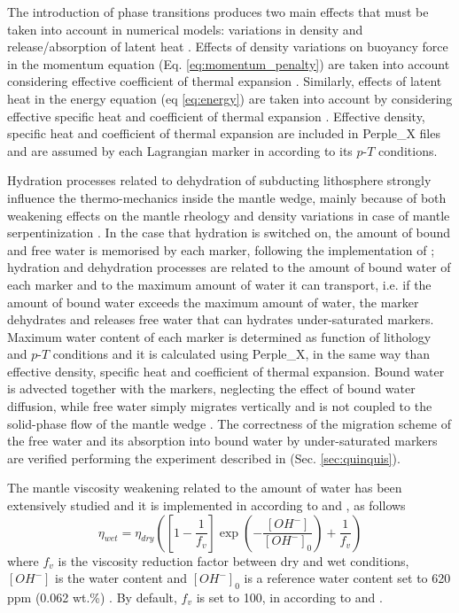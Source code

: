 \documentclass[hidelinks,10pt,a4paper]{article}
\begin{document}
The introduction of phase transitions produces two main effects that must be taken into account in numerical models: variations in density and release/absorption
of latent heat \citep{Tackley2010}. Effects of density variations on buoyancy force in the momentum equation (Eq. \ref{eq:momentum_penalty}) are taken into
account considering effective coefficient of thermal expansion \citep{Christensen1985,Zhong2015}. Similarly, effects of latent heat in the energy equation
(eq \ref{eq:energy}) are taken into account by considering effective specific heat and coefficient of thermal expansion
\citep{Christensen1985,Tackley2010,Zhong2015}. Effective density, specific heat and coefficient of thermal expansion are included in Perple\_X files and are
assumed by each Lagrangian marker in according to its $p$-$T$ conditions.

Hydration processes related to dehydration of subducting lithosphere \citep{Schmidt1998,Liu2007,Faccenda2009,Faccenda2010,Faccenda2014,Rosas2016} strongly
influence the thermo-mechanics inside the mantle wedge, mainly because of both weakening effects on the mantle rheology and density variations in case of
mantle serpentinization \citep{Gerya2002,Honda2003,Arcay2005,Roda2010,Regorda2017}. In the case that hydration is switched on, the amount of bound and free
water is memorised by each marker, following the implementation of \citet{Quinquis2014}; hydration and dehydration processes are related to the amount of bound
water of each marker and to the maximum amount of water it can transport, i.e. if the amount of bound water exceeds the maximum amount of water, the marker
dehydrates and releases free water that can hydrates under-saturated markers. Maximum water content of each marker is determined as function of lithology and
$p$-$T$ conditions and it is calculated using Perple\_X, in the same way than effective density, specific heat and coefficient of thermal expansion. Bound water
is advected together with the markers, neglecting the effect of bound water diffusion, while free water simply migrates vertically and is not coupled to the
solid-phase flow of the mantle wedge \citep{Arcay2005,Quinquis2014}. The correctness of the migration scheme of the free water and its absorption into bound
water by under-saturated markers are verified performing the experiment described in \citet{Quinquis2014} (Sec. \ref{sec:quinquis}).

The mantle viscosity weakening related to the amount of water has been extensively studied \citep{Chopra1981,Hirth2003} and it is implemented in according to
\citet{Arcay2005} and \citet{Horiuchi2016}, as follows
\begin{equation}\label{eq:wet_visc}
\eta_{wet}=\eta_{dry}\left(\left[1-\frac{1}{f_v}\right]\exp\left(-\frac{[OH^-]}{[OH^-]_0}\right)+\frac{1}{f_v}\right)
\end{equation}
where $f_v$ is the viscosity reduction factor between dry and wet conditions, $[OH^-]$ is the water content and $[OH^-]_0$ is a reference water content set to
620 ppm (0.062 wt.\%) \citep{Arcay2005}. By default, $f_v$ is set to 100, in according to \citet{Arcay2005} and \citet{Horiuchi2016}.
\end{document}
